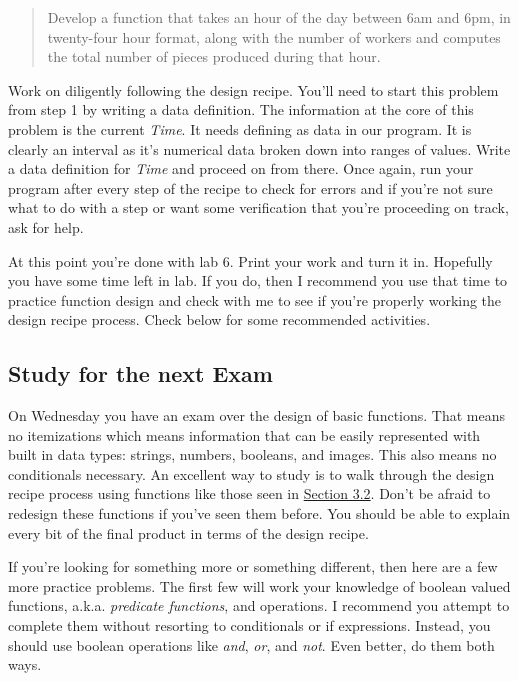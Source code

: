 \documentclass[nobib]{tufte-handout}
\begin{document}
\begin{enumerate}
\begin{quote}
    Develop a function that takes an hour of the day between 6am and 6pm, in twenty-four hour format, along with the number of workers and computes the total number of pieces produced during that hour.
  \end{quote}
  Work on diligently following the design recipe. You'll need to start this problem from step 1 by writing a data definition. The information at the core of this problem is the current \textit{Time}. It needs defining as data in our program. It is clearly an interval as it's numerical data broken down into ranges of values. Write a data definition for \textit{Time} and proceed on from there. Once again, run your program after every step of the recipe to check for errors and if you're not sure what to do with a step or want some verification that you're proceeding on track, ask for help.

\end{enumerate}

At this point you're done with lab 6. Print your work and turn it in. Hopefully you have some time left in lab. If you do, then I recommend you use that time to practice function design and check with me to see if you're properly working the design recipe process. Check below for some recommended activities.

\subsection*{Study for the next Exam}

On Wednesday you have an exam over the design of basic functions. That means no itemizations which means information that can be easily represented with built in data types: strings, numbers, booleans, and images. This also means no conditionals necessary.  An excellent way to study is to walk through the design recipe process using functions like those seen in \href{http://htdp.org/2018-01-06/Book/part_one.html#%28part._sec~3afinger-design%29}{Section 3.2}. Don't be afraid to redesign these functions if you've seen them before. You should be able to explain every bit of the final product in terms of the design recipe.

If you're looking for something more or something different, then here are a few more practice problems. The first few will work your knowledge of boolean valued functions, a.k.a. \textit{predicate functions}, and operations. I recommend you attempt to complete them without resorting to conditionals or if expressions. Instead, you should use boolean operations like \textit{and}, \textit{or},  and \textit{not}.  Even better, do them both ways.
\end{document}
